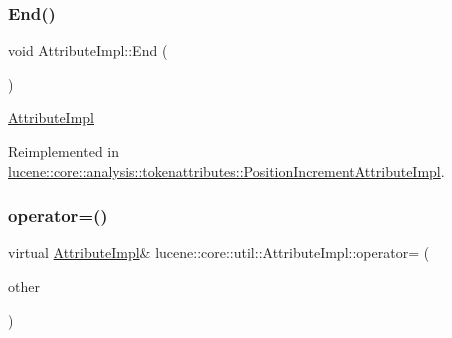 \subsubsection{\texorpdfstring{End()}{End()}}
{\footnotesize\ttfamily void Attribute\+Impl\+::\+End (\begin{DoxyParamCaption}{ }\end{DoxyParamCaption})\hspace{0.3cm}{\ttfamily [virtual]}}

\mbox{\hyperlink{classlucene_1_1core_1_1util_1_1AttributeImpl}{Attribute\+Impl}} 

Reimplemented in \mbox{\hyperlink{classlucene_1_1core_1_1analysis_1_1tokenattributes_1_1PositionIncrementAttributeImpl_adb934ddcbf6f584c50a72c0980b88761}{lucene\+::core\+::analysis\+::tokenattributes\+::\+Position\+Increment\+Attribute\+Impl}}.

\mbox{\label{classlucene_1_1core_1_1util_1_1AttributeImpl_ab032e399d03ce2f58c76881cf2b92325}} 
\subsubsection{\texorpdfstring{operator=()}{operator=()}}
{\footnotesize\ttfamily virtual \mbox{\hyperlink{classlucene_1_1core_1_1util_1_1AttributeImpl}{Attribute\+Impl}}\& lucene\+::core\+::util\+::\+Attribute\+Impl\+::operator= (\begin{DoxyParamCaption}\item[{\mbox{\hyperlink{ZlibCrc32_8h_a2c212835823e3c54a8ab6d95c652660e}{const}} \mbox{\hyperlink{classlucene_1_1core_1_1util_1_1AttributeImpl}{Attribute\+Impl}} \&}]{other }\end{DoxyParamCaption})\hspace{0.3cm}{\ttfamily [pure virtual]}}



